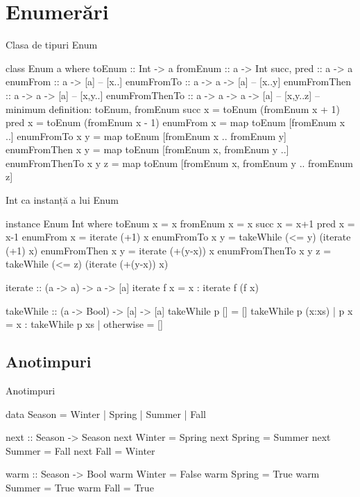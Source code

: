 \documentclass[xcolor=pdftex,romanian,colorlinks]{beamer}
\begin{document}
\section{Enumerări}

\begin{frame}[fragile]{Clasa de tipuri Enum}
\vspace{-2ex}
\begin{asciihs}
  class Enum a where
    toEnum         ::   Int -> a
    fromEnum       ::   a -> Int
    succ, pred     ::   a -> a
    enumFrom       ::   a -> [a]             --   [x..]
    enumFromTo     ::   a -> a -> [a]        --   [x..y]
    enumFromThen   ::   a -> a -> [a]        --   [x,y..]
    enumFromThenTo ::   a -> a -> a -> [a]   --   [x,y..z]
   -- minimum definition: toEnum, fromEnum
   succ x           = toEnum (fromEnum x + 1)
   pred x           = toEnum (fromEnum x - 1)
   enumFrom x
     = map toEnum [fromEnum x ..]
   enumFromTo x y
     = map toEnum [fromEnum x .. fromEnum y]
   enumFromThen x y
     = map toEnum [fromEnum x, fromEnum y ..]
   enumFromThenTo x y z
     = map toEnum [fromEnum x, fromEnum y .. fromEnum z]
\end{asciihs}
\end{frame}
\begin{frame}[fragile]{Int ca instanță a lui Enum}
\begin{asciihs}
  instance Enum Int where
    toEnum x          = x
    fromEnum x        = x
    succ x            = x+1
    pred x            = x-1
    enumFrom x        = iterate (+1) x
    enumFromTo x y    = takeWhile (<= y) (iterate (+1) x)
    enumFromThen x y  = iterate (+(y-x)) x
    enumFromThenTo x y z
        = takeWhile (<= z) (iterate (+(y-x)) x)

  iterate :: (a -> a) -> a -> [a]
  iterate f x = x : iterate f (f x)

  takeWhile :: (a -> Bool) -> [a]   ->   [a]
  takeWhile p []                    =    []
  takeWhile p (x:xs) | p x          =    x : takeWhile p xs
                     | otherwise    =    []
\end{asciihs}
\end{frame}

\subsection{Anotimpuri}

\begin{frame}[fragile]{Anotimpuri}
\begin{asciihs}
  data Season = Winter | Spring | Summer | Fall

  next   :: Season -> Season
  next   Winter = Spring
  next   Spring = Summer
  next   Summer = Fall
  next   Fall    = Winter

  warm   :: Season -> Bool
  warm   Winter = False
  warm   Spring = True
  warm   Summer = True
  warm   Fall    = True
\end{asciihs}
\end{frame}
\end{document}
